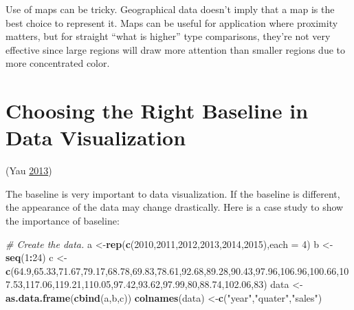 \documentclass[]{book}
\newenvironment{Shaded}{\begin{snugshade}}{\end{snugshade}}
\newcommand{\KeywordTok}[1]{\textcolor[rgb]{0.13,0.29,0.53}{\textbf{#1}}}
\newcommand{\DataTypeTok}[1]{\textcolor[rgb]{0.13,0.29,0.53}{#1}}
\newcommand{\DecValTok}[1]{\textcolor[rgb]{0.00,0.00,0.81}{#1}}
\newcommand{\FloatTok}[1]{\textcolor[rgb]{0.00,0.00,0.81}{#1}}
\newcommand{\StringTok}[1]{\textcolor[rgb]{0.31,0.60,0.02}{#1}}
\newcommand{\CommentTok}[1]{\textcolor[rgb]{0.56,0.35,0.01}{\textit{#1}}}
\newcommand{\OperatorTok}[1]{\textcolor[rgb]{0.81,0.36,0.00}{\textbf{#1}}}
\newcommand{\NormalTok}[1]{#1}
\begin{document}
Use of maps can be tricky. Geographical data doesn't imply that a map is
the best choice to represent it. Maps can be useful for application
where proximity matters, but for straight ``what is higher'' type
comparisons, they're not very effective since large regions will draw
more attention than smaller regions due to more concentrated color.

\section{Choosing the Right Baseline in Data
Visualization}\label{choosing-the-right-baseline-in-data-visualization}

(Yau \protect\hyperlink{ref-baseline_2013}{2013})

The baseline is very important to data visualization. If the baseline is
different, the appearance of the data may change drastically. Here is a
case study to show the importance of baseline:

\begin{Shaded}
\begin{Highlighting}[]
\CommentTok{# Create the data.}
\NormalTok{a <-}\KeywordTok{rep}\NormalTok{(}\KeywordTok{c}\NormalTok{(}\DecValTok{2010}\NormalTok{,}\DecValTok{2011}\NormalTok{,}\DecValTok{2012}\NormalTok{,}\DecValTok{2013}\NormalTok{,}\DecValTok{2014}\NormalTok{,}\DecValTok{2015}\NormalTok{),}\DataTypeTok{each =} \DecValTok{4}\NormalTok{)}
\NormalTok{b <-}\StringTok{ }\KeywordTok{seq}\NormalTok{(}\DecValTok{1}\OperatorTok{:}\DecValTok{24}\NormalTok{)}
\NormalTok{c <-}\StringTok{ }\KeywordTok{c}\NormalTok{(}\FloatTok{64.9}\NormalTok{,}\FloatTok{65.33}\NormalTok{,}\FloatTok{71.67}\NormalTok{,}\FloatTok{79.17}\NormalTok{,}\FloatTok{68.78}\NormalTok{,}\FloatTok{69.83}\NormalTok{,}\FloatTok{78.61}\NormalTok{,}\FloatTok{92.68}\NormalTok{,}\FloatTok{89.28}\NormalTok{,}\FloatTok{90.43}\NormalTok{,}\FloatTok{97.96}\NormalTok{,}\FloatTok{106.96}\NormalTok{,}\FloatTok{100.66}\NormalTok{,}\FloatTok{107.53}\NormalTok{,}\FloatTok{117.06}\NormalTok{,}\FloatTok{119.21}\NormalTok{,}\FloatTok{110.05}\NormalTok{,}\FloatTok{97.42}\NormalTok{,}\FloatTok{93.62}\NormalTok{,}\FloatTok{97.99}\NormalTok{,}\DecValTok{80}\NormalTok{,}\FloatTok{88.74}\NormalTok{,}\FloatTok{102.06}\NormalTok{,}\DecValTok{83}\NormalTok{)}
\NormalTok{data <-}\StringTok{ }\KeywordTok{as.data.frame}\NormalTok{(}\KeywordTok{cbind}\NormalTok{(a,b,c))}
\KeywordTok{colnames}\NormalTok{(data) <-}\KeywordTok{c}\NormalTok{(}\StringTok{"year"}\NormalTok{,}\StringTok{"quater"}\NormalTok{,}\StringTok{"sales"}\NormalTok{)}
\end{Highlighting}
\end{Shaded}
\end{document}
